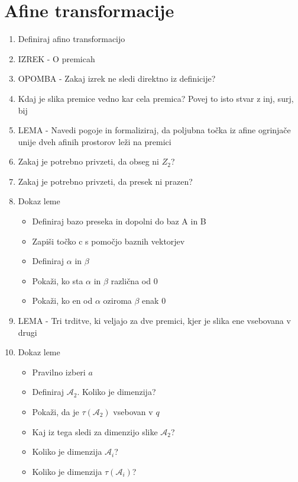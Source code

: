 \documentclass{article}
\begin{document}
    \section{Afine transformacije}
    \begin{enumerate}
        \item Definiraj afino transformacijo
        \item IZREK - O premicah
        \item OPOMBA - Zakaj izrek ne sledi direktno iz definicije?
        \item Kdaj je slika premice vedno kar cela premica? Povej to isto stvar z inj, surj, bij
        \item LEMA - Navedi pogoje in formaliziraj, da poljubna točka iz afine ogrinjače unije dveh afinih prostorov leži na premici
        \item Zakaj je potrebno privzeti, da obseg ni $Z_2$?
        \item Zakaj je potrebno privzeti, da presek ni prazen?
        \item Dokaz leme
        \begin{itemize}
            \item Definiraj bazo preseka in dopolni do baz A in B
            \item Zapiši točko c s pomočjo baznih vektorjev
            \item Definiraj $\alpha$ in $\beta$
            \item Pokaži, ko sta $\alpha$ in $\beta$ različna od 0
            \item Pokaži, ko en od $\alpha$ oziroma $\beta$ enak 0
        \end{itemize}
        \item LEMA - Tri trditve, ki veljajo za dve premici, kjer je slika ene vsebovana v drugi
        \item Dokaz leme
        \begin{itemize}
            \item Pravilno izberi $a$
            \item Definiraj $\mathcal{A}_2$. Koliko je dimenzija?
            \item Pokaži, da je $\tau (\mathcal{A}_2)$ vsebovan v $q$
            \item Kaj iz tega sledi za dimenzijo slike $\mathcal{A}_2$?
            \item Koliko je dimenzija $\mathcal{A}_i$?
            \item Koliko je dimenzija $\tau (\mathcal{A}_i)$?

\end{itemize}
\end{enumerate}
\end{document}
